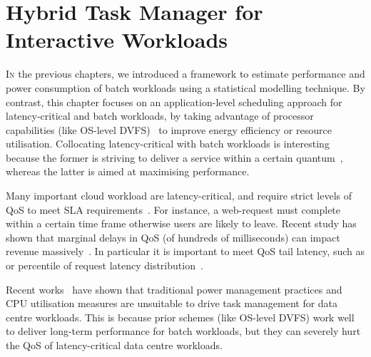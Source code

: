 \chapter{Hybrid Task Manager for Interactive Workloads}
\label{chapter: hipster}


 \lettrine{I}{n} the previous chapters, we introduced a framework to
estimate performance and power consumption of batch workloads using a statistical
modelling technique. By contrast, this chapter focuses on an application-level scheduling
approach for latency-critical and batch workloads, by taking advantage of processor
capabilities (like OS-level DVFS)~\citep{WonyoungKim2008SystemRegulators,
Godycki2014EnablingNetworks, Putnam2014AServices, Lo2014DynamicChips} to improve energy
efficiency or resource utilisation.  Collocating latency-critical with batch workloads is
interesting because the former is striving to deliver a service within a certain
quantum~\citep{Barroso2013TheEdition}, whereas the latter is aimed at maximising
performance.




 Many important cloud workload are latency-critical, and require strict levels of QoS to
meet SLA requirements~\citep{Lo2015Heracles, Kasture2015Rubik, Lo2014TowardsWorkloads}.
For instance, a web-request must complete within a certain time frame otherwise users are
likely to leave.  Recent study has shown that marginal delays in QoS (of hundreds of
milliseconds) can impact revenue massively~\citep{Eric2009TheSearch}. In particular it is
important to meet QoS tail latency, such as \ninefive or \ninenine percentile of request
latency distribution~\citep{Dean2013TheScale}.


 Recent works~\citep{Petrucci2015Octopus-Man:Computers, Lo2015Heracles, Kasture2015Rubik,
Delimitrou2013Paragon:Datacenters, Vamanan2015TimeTrader:Search, Zhu2016Dirigent} have shown that
traditional power management practices and CPU utilisation measures are unsuitable to
drive task management for data centre workloads.  This is because prior schemes (like
OS-level DVFS) work well to deliver long-term performance for batch workloads, but they
can severely hurt the QoS of latency-critical data centre workloads. 

